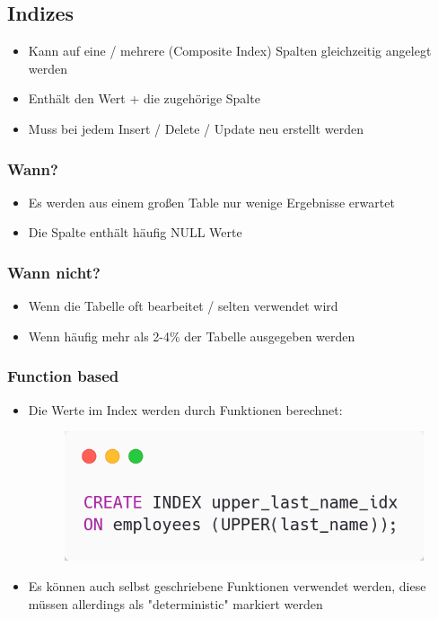 \subsection{Indizes}
\begin{itemize}
    \item Kann auf eine / mehrere (Composite Index) Spalten gleichzeitig angelegt werden
    \item Enthält den Wert + die zugehörige Spalte
    \item Muss bei jedem Insert / Delete / Update neu erstellt werden
\end{itemize}

\subsubsection{Wann?}
\begin{itemize}
    \item Es werden aus einem großen Table nur wenige Ergebnisse erwartet
    \item Die Spalte enthält häufig NULL Werte
\end{itemize}

\subsubsection{Wann nicht?}
\begin{itemize}
    \item Wenn die Tabelle oft bearbeitet / selten verwendet wird
    \item Wenn häufig mehr als 2-4\% der Tabelle ausgegeben werden
\end{itemize}

\subsubsection{Function based}
\begin{itemize}
    \item Die Werte im Index werden durch Funktionen berechnet:
    \begin{figure}[H]
        \centering
        \includegraphics[scale=.4]{res/themekorb_2/function_based.png} 
    \end{figure}
    \item Es können auch selbst geschriebene Funktionen verwendet werden, diese müssen allerdings als "deterministic" markiert werden
\end{itemize}

